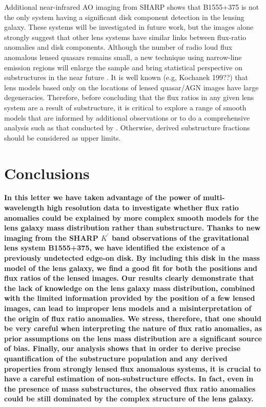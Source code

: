 \documentclass[useAMS,usenatbib]{mn2e}
\begin{document}
Additional near-infrared AO imaging from SHARP shows that B1555+375 is
not the only system having a significant disk component detection in
the lensing galaxy.  These systems will be investigated in
future work, but the images alone strongly suggest that other lens
systems have similar links between flux-ratio anomalies and disk
components.  Although the number of radio loud flux anomalous lensed
quasars remains small, a new technique using narrow-line emission
regions will enlarge the sample and bring statistical perspective on
substructures in the near future \citep{N14}. It is well known (e.g,
Kochanek 199??) that lens models based only on the locations of lensed
quasar/AGN images have large degeneracies. Therefore, before
concluding that the flux ratios in any given lens system are a result
of substructure, it is critical to explore a range of smooth models
that are informed by additional observations or to do a comprehensive
analysis such as that conducted by \citet{Xu14}. Otherwise, derived
substructure fractions should be considered as upper limits.

\section{Conclusions}
{\bf In this letter we have taken advantage of the power of multi-wavelength high resolution data to investigate whether flux ratio anomalies could be explained by more complex smooth models for the lens galaxy mass distribution rather than substructure. Thanks to new imaging from the SHARP $K^{\prime}$ band observations of the gravitational lens system B1555+375, we have identified the existence of a previously undetected edge-on disk. By including this disk in the mass model of the lens galaxy, we find a good fit for both the positions and flux ratios of the lensed images. Our results clearly demonstrate that the lack of knowledge on the lens galaxy mass distribution, combined with the limited information provided by the position of a few lensed images, can lead to improper lens models and a misinterpretation of the origin of flux ratio anomalies. 
We stress, therefore, that one should be very careful when interpreting the nature of flux ratio anomalies, as prior assumptions on the lens mass distribution are a significant source of bias. Finally, our analysis shows that in order to derive precise quantification of the substructure population and any derived properties from strongly lensed flux anomalous systems, it is crucial to have a careful estimation of non-substructure effects. In fact, even in the presence of mass substructures, the observed flux ratio anomalies could be still dominated by the complex structure of the lens galaxy.}
\end{document}
